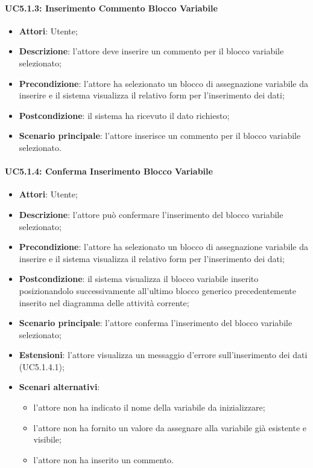 \begin{itemize}
\begin{itemize}
\begin{itemize}
\begin{itemize}
\paragraph{UC5.1.3: Inserimento Commento Blocco Variabile}
\label{UC5.1.3}
\begin{itemize}
	\item \textbf{Attori}: Utente;
	\item \textbf{Descrizione}: l'attore deve inserire un commento per il blocco variabile selezionato;
	\item \textbf{Precondizione}: l'attore ha selezionato un blocco di assegnazione variabile da inserire e il sistema visualizza il relativo form per l'inserimento dei dati;
	\item \textbf{Postcondizione}: il sistema ha ricevuto il dato richiesto;
	\item \textbf{Scenario principale}: l'attore inserisce un commento per il blocco variabile selezionato.
\end{itemize}

\paragraph{UC5.1.4: Conferma Inserimento Blocco Variabile}
\label{UC5.1.4}
\begin{itemize}
	\item \textbf{Attori}: Utente;
	\item \textbf{Descrizione}: l'attore può confermare l'inserimento del blocco variabile selezionato;
	\item \textbf{Precondizione}: l'attore ha selezionato un blocco di assegnazione variabile da inserire e il sistema visualizza il relativo form per l'inserimento dei dati;
	\item \textbf{Postcondizione}: il sistema visualizza il blocco variabile inserito posizionandolo successivamente all'ultimo blocco generico precedentemente inserito nel diagramma delle attività corrente;
	\item \textbf{Scenario principale}: l'attore conferma l'inserimento del blocco variabile selezionato;
	\item \textbf{Estensioni}: l'attore visualizza un messaggio d'errore sull'inserimento dei dati (UC5.1.4.1);
	\item \textbf{Scenari alternativi}:
	\begin{itemize}
		\item l'attore non ha indicato il nome della variabile da inizializzare;
		\item l'attore non ha fornito un valore da assegnare alla variabile già esistente e visibile;
		\item l'attore non ha inserito un commento.
	\end{itemize}
\end{itemize}


\end{itemize}
\end{itemize}
\end{itemize}
\end{itemize}
